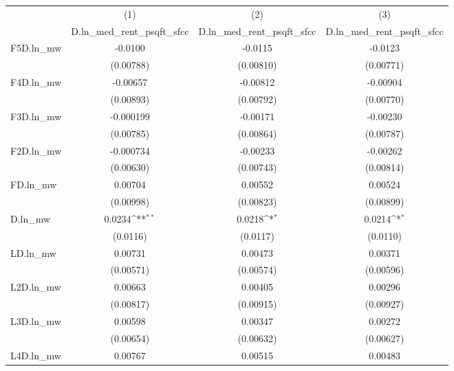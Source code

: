 {
\def\sym#1{\ifmmode^{#1}\else\(^{#1}\)\fi}
\begin{tabular}{l*{3}{c}}
\hline\hline
          &\multicolumn{1}{c}{(1)}&\multicolumn{1}{c}{(2)}&\multicolumn{1}{c}{(3)}\\
          &\multicolumn{1}{c}{D.ln\_med\_rent\_psqft\_sfcc}&\multicolumn{1}{c}{D.ln\_med\_rent\_psqft\_sfcc}&\multicolumn{1}{c}{D.ln\_med\_rent\_psqft\_sfcc}\\
\hline
F5D.ln\_mw &  -0.0100         &  -0.0115         &  -0.0123         \\
          &(0.00788)         &(0.00810)         &(0.00771)         \\
[1em]
F4D.ln\_mw & -0.00657         & -0.00812         & -0.00904         \\
          &(0.00893)         &(0.00792)         &(0.00770)         \\
[1em]
F3D.ln\_mw &-0.000199         & -0.00171         & -0.00230         \\
          &(0.00785)         &(0.00864)         &(0.00787)         \\
[1em]
F2D.ln\_mw &-0.000734         & -0.00233         & -0.00262         \\
          &(0.00630)         &(0.00743)         &(0.00814)         \\
[1em]
FD.ln\_mw  &  0.00704         &  0.00552         &  0.00524         \\
          &(0.00998)         &(0.00823)         &(0.00899)         \\
[1em]
D.ln\_mw   &   0.0234\sym{**} &   0.0218\sym{*}  &   0.0214\sym{*}  \\
          & (0.0116)         & (0.0117)         & (0.0110)         \\
[1em]
LD.ln\_mw  &  0.00731         &  0.00473         &  0.00371         \\
          &(0.00571)         &(0.00574)         &(0.00596)         \\
[1em]
L2D.ln\_mw &  0.00663         &  0.00405         &  0.00296         \\
          &(0.00817)         &(0.00915)         &(0.00927)         \\
[1em]
L3D.ln\_mw &  0.00598         &  0.00347         &  0.00272         \\
          &(0.00654)         &(0.00632)         &(0.00627)         \\
[1em]
L4D.ln\_mw &  0.00767         &  0.00515         &  0.00483         \\

\end{tabular}}
